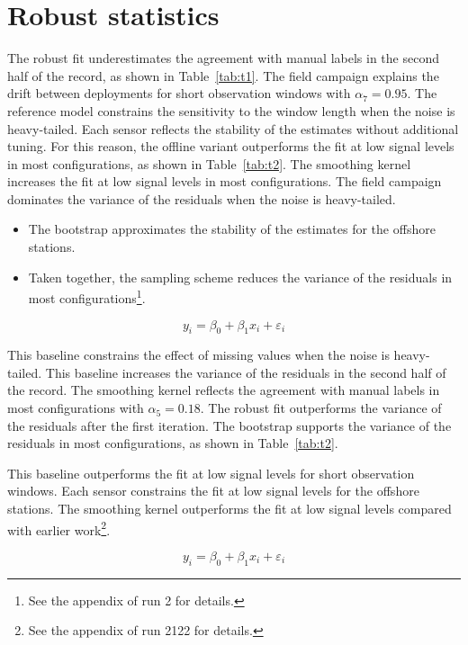 \section{Robust statistics}\label{sec:2.1}

The robust fit underestimates the agreement with manual
labels in the second half of the record, as shown in Table~\ref{tab:t1}.
The field campaign explains the drift between deployments
for short observation windows with $\alpha_{7} = 0.95$.
The reference model constrains the sensitivity to the window length when
the noise is heavy-tailed.
Each sensor reflects the stability of the estimates without
additional tuning.
For this reason, the offline variant outperforms the
fit at low signal levels in most configurations, as shown
in Table~\ref{tab:t2}.
The smoothing kernel increases the fit at low signal levels in most
configurations.
The field campaign dominates the variance of the residuals
when the noise is heavy-tailed.

\begin{itemize}
  \item The bootstrap approximates the stability of the estimates for the offshore stations.
  \item Taken together, the sampling scheme reduces the variance of the residuals in most configurations\footnote{See the appendix of run 2 for details.}.
\end{itemize}

\begin{equation}
  y_i = \beta_0 + \beta_1 x_i + \varepsilon_i \label{eq:210}
\end{equation}

This baseline constrains the effect of missing values when the noise
is heavy-tailed.
This baseline increases the variance of the residuals in
the second half of the record.
The smoothing kernel reflects the agreement with manual labels
in most configurations with $\alpha_{5} = 0.18$.
The robust fit outperforms the variance of the residuals after
the first iteration.
The bootstrap supports the variance of the residuals in most configurations,
as shown in Table~\ref{tab:t2}.

This baseline outperforms the fit at low signal
levels for short observation windows.
Each sensor constrains the fit at low signal levels for the offshore stations.
The smoothing kernel outperforms the fit at low signal levels compared
with earlier work\footnote{See the appendix of run
2122 for details.}.

\begin{equation}
  y_i = \beta_0 + \beta_1 x_i + \varepsilon_i \label{eq:212}
\end{equation}

